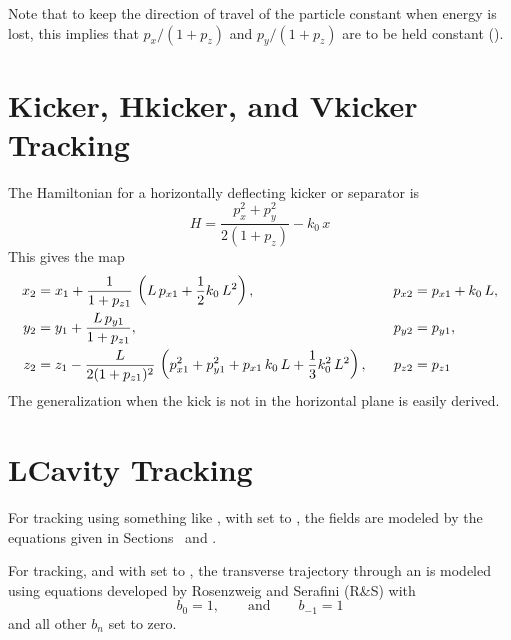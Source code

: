 Note that to keep the direction of travel of the particle constant when energy is lost, this implies
that $p_x/(1+p_z)$ and $p_y/(1+p_z)$ are to be held constant ().

\section{Kicker, Hkicker, and Vkicker Tracking}
\label{s:kicker.std}

The Hamiltonian for a horizontally deflecting kicker or separator is
\begin{equation}
  H = \frac{p_x^2 + p_y^2}{2 (1 + p_z)} - k_0 \, x 
\end{equation}
This gives the map
\begin{alignat}{2}
  x_2 &= x_1 + \frac{1}{1 + p_{z1}} \, \left( L \, p_{x1} + \frac{1}{2} k_0 \, L^2 \right), &
    p_{x2} &= p_{x1} + k_0 \, L, \nonumber \\
  y_2 &= y_1 + \frac{L \, p_{y1}}{1 + p_{z1}}, &
    p_{y2} &= p_{y1},  \\
  z_2 &= z_1 - \frac{L}{2 (1 + p_{z1})^2} \, 
    \left( p_{x1}^2 + p_{y1}^2 + p_{x1} \, k_0 \, L + \frac{1}{3} k_0^2 \, L^2 \right), \quad &
  p_{z2} &= p_{z1} \nonumber
\end{alignat}
The generalization when the kick is not in the horizontal plane is easily derived.

\section{LCavity Tracking}
\label{s:lcavity.std}

For tracking using something like , with  set to ,
the fields are modeled by the equations given in Sections~ and .

For  tracking, and with  set to , the transverse
trajectory through an  is modeled using equations developed by Rosenzweig and
Serafini\cite{b:rosenzweig} (R\&S) with
\begin{equation}
  b_0 = 1, \qquad \text{and} \qquad b_{-1} = 1 
\end{equation}
and all other $b_n$ set to zero.

